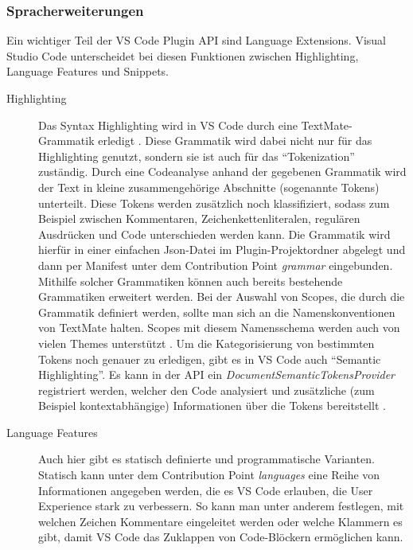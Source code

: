 \subsubsection{Spracherweiterungen}
  Ein wichtiger Teil der VS Code Plugin API sind Language Extensions. Visual Studio Code unterscheidet
  bei diesen Funktionen zwischen Highlighting, Language Features und Snippets.
  \begin{description}
    \item[Highlighting] 
      Das Syntax Highlighting wird in VS Code durch eine TextMate-\linebreak
      Grammatik erledigt \cite{TextMateGrammar}.
      Diese Grammatik wird dabei nicht nur für das Highlighting genutzt, sondern sie ist auch für das \enquote{Tokenization}
      zuständig. Durch eine Codeanalyse anhand der gegebenen Grammatik wird der Text in kleine 
      zusammengehörige Abschnitte (sogenannte Tokens) unterteilt. Diese Tokens werden zusätzlich noch 
      klassifiziert, sodass zum Beispiel zwischen Kommentaren, Zeichenkettenliteralen, regulären Ausdrücken und Code unterschieden werden kann.
      Die Grammatik wird hierfür in einer einfachen Json-Datei im Plugin-Projektordner abgelegt und dann per Manifest
      unter dem Contribution Point \emph{grammar} eingebunden. Mithilfe solcher Grammatiken können auch bereits bestehende
      Grammatiken erweitert werden. Bei der Auswahl von Scopes, die durch die Grammatik definiert werden, sollte man sich
      an die Namenskonventionen von TextMate halten. Scopes mit diesem Namensschema werden auch von vielen Themes unterstützt
      \cite{VSCodeExtensionAPISyntaxHighlightGuide}.
      Um die Kategorisierung von bestimmten Tokens noch genauer zu erledigen, gibt es in VS Code auch \enquote{Semantic Highlighting}. 
      Es kann in der API ein \emph{DocumentSemanticTokensProvider} registriert werden,
      welcher den Code analysiert und zusätzliche (zum Beispiel kontextabhängige) Informationen über die Tokens bereitstellt
      \cite{VSCodeExtensionAPISemanticHighlightGuide}.
    \item[Language Features] 
      Auch hier gibt es statisch definierte und programmatische Varianten.
      Statisch kann unter dem Contribution Point \emph{languages} eine Reihe von Informationen angegeben werden,
      die es VS Code erlauben, die User Experience stark zu verbessern. So kann man unter anderem festlegen,
      mit welchen Zeichen Kommentare eingeleitet werden oder welche Klammern es gibt, damit VS Code 
      das Zuklappen von Code-Blöckern ermöglichen kann.

\end{description}
